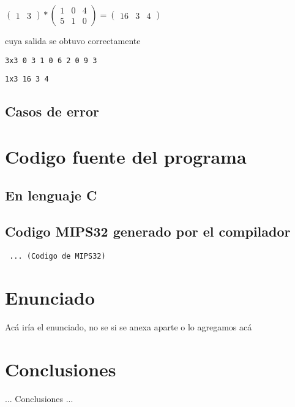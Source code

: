 \documentclass[10pt,a4paper]{article}
\begin{document}
		\begin{center}
		$\begin{pmatrix}
		1 & 3
		\end{pmatrix}
		*
		\begin{pmatrix}
		1 & 0 & 4 \\ 5 & 1 & 0
		\end{pmatrix}
		=
		\begin{pmatrix}
		16 & 3 & 4
		\end{pmatrix}
		$\end{center}
	
		cuya salida se obtuvo correctamente
	
		\texttt{3x3 0 3 1 0 6 2 0 9 3}
		
		\texttt{1x3 16 3 4}

	\subsection{Casos de error}

\newpage
\section{Codigo fuente del programa}

\subsection{En lenguaje C}



\subsection{Codigo MIPS32 generado por el compilador}

\texttt{
... (Codigo de MIPS32)
}

\section{Enunciado}

Acá iría el enunciado, no se si se anexa aparte o lo agregamos acá


\section{Conclusiones}

...  Conclusiones  ...
\end{document}
